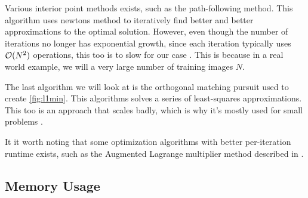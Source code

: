Various interior point methods exists, such as the path-following method. This algorithm uses newtons method to iteratively find better and better approximations to the optimal solution. However, even though the number of iterations no longer has exponential growth, since each iteration typically uses $ \mathcal{O}(N^{2}) $ operations, this too is to slow for our case \cite[Section~12.6]{eldar12theoryapplic}. This is because in a real world example, we will a very large number of training images $ N $.

The last algorithm we will look at is the orthogonal matching pursuit used to create \cref{fig:l1min}. This algorithms solves a series of least-squares approximations. This too is an approach that scales badly, which is why it's mostly used for small problems \cite[Secion~3.2]{foucart13intro}.

It it worth noting that some optimization algorithms with better per-iteration runtime exists, such as the Augmented Lagrange multiplier method described in \cite[Alg.~12.2]{foucart13intro}. 



\subsection{Memory Usage}









